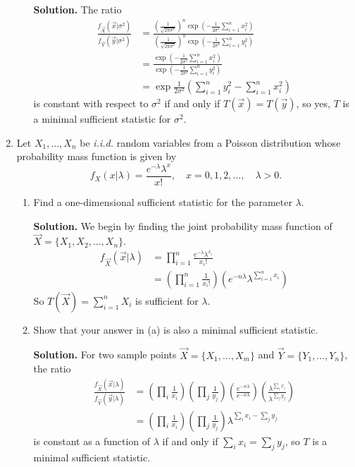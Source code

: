 \documentclass[titlepage]{article}
\begin{document}
\begin{enumerate}
\begin{enumerate}
  \textbf{Solution.} The ratio
  \[
  \begin{aligned}
  \frac{f_\vec{X}(\vec{x} | \sigma^2) }{f_\vec{Y}(\vec{y} | \sigma^2)} &= \frac{\left(\frac{1}{\sqrt{2\pi\sigma^2}}\right)^n \exp\left(-\frac{1}{2\sigma^2} \sum_{i=1}^n x_i^2\right)}{\left(\frac{1}{\sqrt{2\pi\sigma^2}}\right)^n \exp\left(-\frac{1}{2\sigma^2} \sum_{i=1}^n y_i^2\right)} \\
  &= \frac{\exp\left(-\frac{1}{2\sigma^2} \sum_{i=1}^n x_i^2\right)}{ \exp\left(-\frac{1}{2\sigma^2} \sum_{i=1}^n y_i^2\right)} \\
  &= \exp\frac{1}{2\sigma^2}\left(\sum_{i=1}^n y_i^2 - \sum_{i=1}^n x_i^2\right)
  \end{aligned}
  \]
  is constant with respect to $\sigma^2$ if and only if $T(\vec{x}) = T(\vec{y})$, so yes, $T$ is a minimal sufficient statistic for $\sigma^2$.
  \end{enumerate}

\item Let $X_1, \ldots, X_n$ be \emph{i.i.d.} random variables from a Poisson distribution whose probability mass function is given by
\[f_X(x|\lambda)=\frac{e^{-\lambda}\lambda^x}{x!}, \quad x=0,1,2,\ldots, \quad \lambda > 0. \]
  \begin{enumerate}
  \item Find a one-dimensional sufficient statistic for the parameter $\lambda$.

  \textbf{Solution.} We begin by finding the joint probability mass function of $\vec{X} = \{X_1, X_2, \ldots, X_n\}$.
  \[\begin{aligned}
  f_\vec{X}(\vec{x} | \lambda) &= \prod_{i=1}^n \frac{e^{-\lambda}\lambda^{x_i}}{x_i!} \\
  &= \left(\prod_{i=1}^n\frac{1}{x_i !}\right)\left(e^{-n\lambda}\lambda^{\sum_{i=1}^n x_i}\right)
  \end{aligned}\]
  So $T(\vec{X}) = \sum_{i=1}^n X_i$ is sufficient for $\lambda$.

  \item Show that your answer in (a) is also a minimal sufficient statistic.

  \textbf{Solution.} For two sample points $\vec{X} = \{X_1, \ldots, X_m\}$ and $\vec{Y} = \{Y_1, \ldots, Y_n\}$, the ratio
  \[\begin{aligned}
  \frac{f_\vec{X}(\vec{x} | \lambda) }{f_\vec{Y}(\vec{y} | \lambda)} &= \left( \prod_i \frac{1}{x_i} \right) \left(\prod_j \frac{1}{y_j}\right)\left( \frac{e^{-n\lambda}}{e^{-n\lambda}} \right) \left(\frac{\lambda^{\sum_i x_i}}{\lambda^{\sum_j y_j}}\right) \\
  &= \left( \prod_i \frac{1}{x_i} \right) \left(\prod_j \frac{1}{y_j}\right)\lambda^{\sum_i x_i - \sum_j y_j}
  \end{aligned}\]
  is constant as a function of $\lambda$ if and only if $\sum_i x_i = \sum_j y_j$, so $T$ is a minimal sufficient statistic.
  \end{enumerate}


\end{enumerate}
\end{document}
